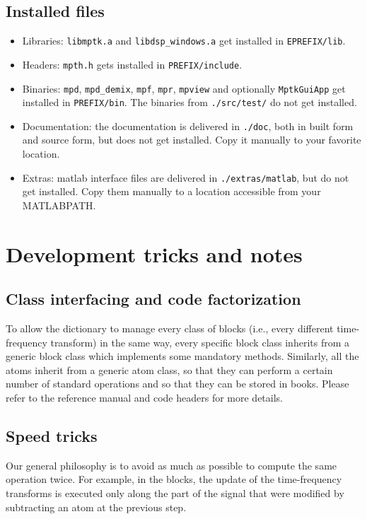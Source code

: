 \documentclass[11pt,a4paper]{article}
\begin{document}
\subsection{Installed files}
\begin{itemize}
\item Libraries: \verb+libmptk.a+ and \verb+libdsp_windows.a+ get installed in
  \verb+EPREFIX/lib+.
\item Headers: \verb+mpth.h+ gets installed in \verb+PREFIX/include+.
\item Binaries: \verb+mpd+, \verb+mpd_demix+, \verb+mpf+, \verb+mpr+,
  \verb+mpview+ and optionally \verb+MptkGuiApp+ get installed in
  \verb+PREFIX/bin+. The binaries from \verb+./src/test/+ do not get installed.
\item Documentation: the documentation is delivered in \verb+./doc+, both in
  built form and source form, but does not get installed. Copy it manually to
  your favorite location.
\item Extras: matlab interface files are delivered in \verb+./extras/matlab+,
  but do not get installed. Copy them manually to a location accessible from
  your MATLABPATH.
\end{itemize}


\clearpage
\section{Development tricks and notes}

\subsection{Class interfacing and code factorization}
To allow the dictionary to manage every class of blocks (i.e., every different
time-frequency transform) in the same way, every specific block class inherits
from a generic block class which implements some mandatory methods.  Similarly,
all the atoms inherit from a generic atom class, so that they can perform a
certain number of standard operations and so that they can be stored in books.
Please refer to the reference manual and code headers for more details.


\subsection{Speed tricks}
Our general philosophy is to avoid as much as possible to compute the same
operation twice.  For example, in the blocks, the update of the time-frequency
transforms is executed only along the part of the signal that were modified by
subtracting an atom at the previous step.
\end{document}

